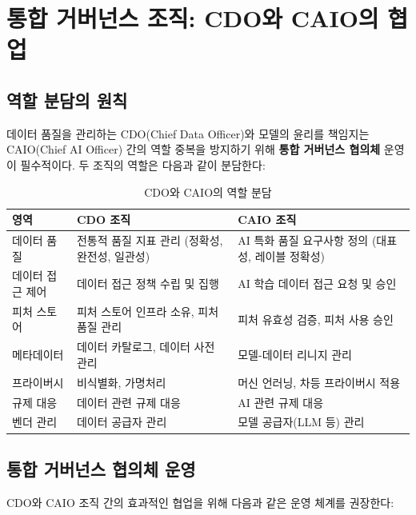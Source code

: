 \section{통합 거버넌스 조직: CDO와 CAIO의 협업}
\label{sec:9.5}

\subsection{역할 분담의 원칙}
\label{sec:9.5.1}

데이터 품질을 관리하는 CDO(Chief Data Officer)와 모델의 윤리를 책임지는 CAIO(Chief AI Officer) 간의 역할 중복을 방지하기 위해 \textbf{통합 거버넌스 협의체} 운영이 필수적이다. 두 조직의 역할은 다음과 같이 분담한다:

\begin{table}[htbp]
\centering
\caption{CDO와 CAIO의 역할 분담}
\label{tab:cdo_caio_roles}
\begin{tabularx}{\textwidth}{p{3cm}XX}
\toprule
\textbf{영역} & \textbf{CDO 조직} & \textbf{CAIO 조직} \\
\midrule
데이터 품질 & 전통적 품질 지표 관리 (정확성, 완전성, 일관성) & AI 특화 품질 요구사항 정의 (대표성, 레이블 정확성) \\
\midrule
데이터 접근 제어 & 데이터 접근 정책 수립 및 집행 & AI 학습 데이터 접근 요청 및 승인 \\
\midrule
피처 스토어 & 피처 스토어 인프라 소유, 피처 품질 관리 & 피처 유효성 검증, 피처 사용 승인 \\
\midrule
메타데이터 & 데이터 카탈로그, 데이터 사전 관리 & 모델-데이터 리니지 관리 \\
\midrule
프라이버시 & 비식별화, 가명처리 & 머신 언러닝, 차등 프라이버시 적용 \\
\midrule
규제 대응 & 데이터 관련 규제 대응 & AI 관련 규제 대응 \\
\midrule
벤더 관리 & 데이터 공급자 관리 & 모델 공급자(LLM 등) 관리 \\
\bottomrule
\end{tabularx}
\end{table}


\subsection{통합 거버넌스 협의체 운영}
\label{sec:9.5.2}

CDO와 CAIO 조직 간의 효과적인 협업을 위해 다음과 같은 운영 체계를 권장한다:

